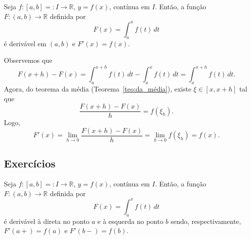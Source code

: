 \begin{teo}\label{teo:teo_fundamental_do_cálculo}
  Seja $f:[a, b]=:I\to\mathbb{R}$, $y=f(x)$, contínua em $I$. Então, a função $F:(a, b)\to\mathbb{R}$ definida por
  \begin{equation}
    F(x) = \int_a^x f(t)\,dt
  \end{equation}
é derivável em $(a, b)$ e $F'(x) = f(x)$.
\end{teo}
\begin{dem}
  Observemos que
  \begin{equation}
    F(x+h)-F(x) = \int_{a}^{x+h}f(t)\,dt - \int_{a}^x f(t)\,dt = \int_x^{x+h}f(t)\,dt.
  \end{equation}
Agora, do teorema da média (Teorema~\ref{teo:da_média}), existe $\xi \in [x, x+h]$ tal que
\begin{equation}
  \frac{F(x+h)-F(x)}{h} = f(\xi_{h}).
\end{equation}
Logo,
\begin{equation}
  F'(x) = \lim_{h\to 0}\frac{F(x+h)-F(x)}{h} = \lim_{h\to 0}f(\xi_{h}) = f(x).
\end{equation}
\end{dem}

\subsection*{Exercícios}

\begin{exer}
  Seja $f:[a, b]=:I\to\mathbb{R}$, $y=f(x)$, contínua em $I$. Então, a função $F:(a, b)\to\mathbb{R}$ definida por
  \begin{equation}
    F(x) = \int_a^x f(t)\,dt
  \end{equation}
é derivável à direta no ponto $a$ e à esquerda no ponto $b$ sendo, respectivamente, $F'(a+) = f(a)$ e $F'(b-) = f(b)$.
\end{exer}